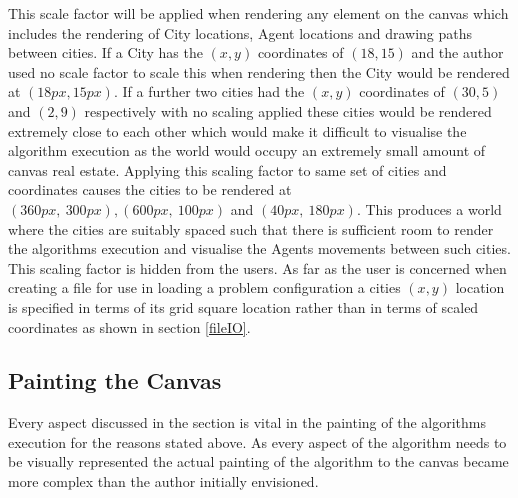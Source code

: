 This scale factor will be applied when rendering any element on the canvas which includes the rendering of City locations, Agent locations and drawing paths between cities. If a City has the $(x,y)$ coordinates of $(18, 15)$ and the author used no scale factor to scale this when rendering then the City would be rendered at $(18px,15px)$. If a further two cities had the $(x,y)$ coordinates of $(30, 5)$ and $(2, 9)$ respectively with no scaling applied these cities would be rendered extremely close to each other which would make it difficult to visualise the algorithm execution as the world would occupy an extremely small amount of canvas real estate. Applying this scaling factor to same set of cities and coordinates causes the cities to be rendered at $(360px,\ 300px), (600px,\ 100px)$ and $(40px,\ 180px)$. This produces a world where the cities are suitably spaced such that there is sufficient room to render the algorithms execution and visualise the Agents movements between such cities. This scaling factor is hidden from the users. As far as the user is concerned when creating a file for use in loading a problem configuration a cities $(x,y)$ location is specified in terms of its grid square location rather than in terms of scaled coordinates as shown in section \ref{fileIO}.

\subsection{Painting the Canvas}

Every aspect discussed in the section is vital in the painting of the algorithms execution for the reasons stated above. As every aspect of the algorithm needs to be visually represented the actual painting of the algorithm to the canvas became more complex than the author initially envisioned. 

